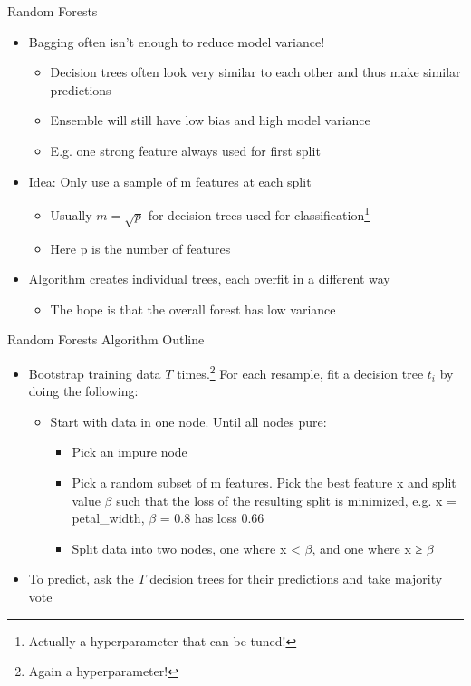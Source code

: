 \documentclass[aspectratio=169]{../latex_main/tntbeamer}  %
\begin{document}
	
	\begin{frame}[c]{Random Forests}
	    \begin{itemize}
	        \item Bagging often isn’t enough to reduce model variance!
	        \begin{itemize}
	            \item Decision trees often look very similar to each other and thus make similar predictions
	            \item Ensemble will still have low bias and high model variance
	            \item E.g. one strong feature always used for first split
	        \end{itemize}
	        \item Idea: Only use a sample of m features at each split
	        \begin{itemize}
	            \item Usually $m = \sqrt{p}$ for decision trees used for classification\footnote{Actually a hyperparameter that can be tuned!}
	            \item Here p is the number of features
	        \end{itemize}
	        \item Algorithm creates individual trees, each overfit in a different way
	        \begin{itemize}
	            \item The hope is that the overall forest has low variance
	        \end{itemize}
	    \end{itemize}
	\end{frame}
	
	\begin{frame}[c]{Random Forests Algorithm Outline}
	    \begin{itemize}
	        \item Bootstrap training data $T$ times.\footnote{Again a hyperparameter!} For each resample, fit a decision tree $t_i$ by doing the following:
	        \begin{itemize}
	            \item Start with data in one node. Until all nodes pure:
	            \begin{itemize}
	                \item Pick an impure node
	                \item Pick a random subset of m features. Pick the best feature x and split value $\beta$ such that the loss of the    resulting split is minimized, e.g. x = petal\_width, $\beta$ = 0.8 has loss 0.66
	                \item Split data into two nodes, one where x < $\beta$, and one where x ≥ $\beta$
	            \end{itemize}
	        \end{itemize}
	        \item To predict, ask the $T$ decision trees for their predictions and take majority vote
	    \end{itemize}
	\end{frame}
	
\end{document}
